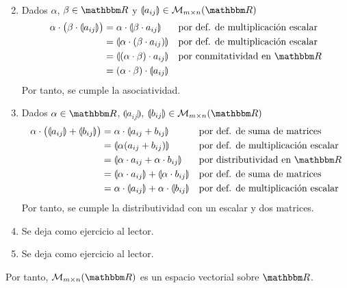 \begin{theorem}
\begin{enumerate}[label=\roman*)]
\begin{align*}
        \end{align*}
        \item Dados $\alpha$, $\beta \in \RR$ y $\llparenthesis a_{ij} \rrparenthesis \in \matrizmn$
        \begin{align*}
            \alpha \cdot \big( \beta \cdot \llparenthesis a_{ij} \rrparenthesis \big) & = \alpha \cdot \llparenthesis \beta \cdot a_{ij} \rrparenthesis && \text{por def. de multiplicación escalar} \\
            & = \llparenthesis \alpha \cdot ( \beta \cdot a_{ij}) \rrparenthesis && \text{por def. de multiplicación escalar} \\
            & = \llparenthesis (\alpha \cdot \beta) \cdot a_{ij} \rrparenthesis && \text{por conmitatividad en $\RR$} \\
            & = ( \alpha \cdot \beta ) \cdot \llparenthesis a_{ij} \rrparenthesis
        \end{align*}
        Por tanto, se cumple la asociatividad.
        \item Dados $\alpha \in \RR$, $\llparenthesis a_{ij} \rrparenthesis$, $\llparenthesis b_{ij} \rrparenthesis \in \matrizmn$
        \begin{align*}
            \alpha \cdot \big( \llparenthesis a_{ij} \rrparenthesis + \llparenthesis b_{ij} \rrparenthesis \big) & = \alpha \cdot \llparenthesis a_{ij} + b_{ij} \rrparenthesis && \text{por def. de suma de matrices} \\
            & = \llparenthesis \alpha (a_{ij} + b_{ij}) \rrparenthesis && \text{por def. de multiplicación escalar} \\
            & = \llparenthesis \alpha \cdot a_{ij} + \alpha \cdot b_{ij} \rrparenthesis && \text{por distributividad en $\RR$} \\
            & = \llparenthesis \alpha \cdot a_{ij} \rrparenthesis + \llparenthesis \alpha \cdot b_{ij} \rrparenthesis && \text{por def. de suma de matrices} \\
            & = \alpha \cdot \llparenthesis a_{ij} \rrparenthesis + \alpha \cdot \llparenthesis b_{ij} \rrparenthesis && \text{por def. de multiplicación escalar}
        \end{align*}
        Por tanto, se cumple la distributividad con un escalar y dos matrices.
        \item Se deja como ejercicio al lector.
        \item Se deja como ejercicio al lector.
    \end{enumerate}
    Por tanto, $\matrizmn$ es un espacio vectorial sobre $\RR$.
\end{theorem}

